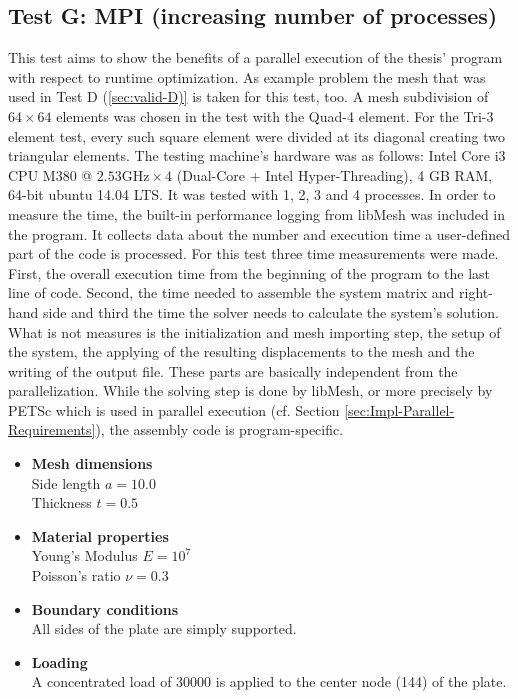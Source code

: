  \subsection{Test G: MPI (increasing number of processes)}\label{sec:valid-G}
  This test aims to show the benefits of a parallel execution of the thesis' program with respect to runtime optimization. As example problem the mesh that was used in Test D (\ref{sec:valid-D)} is taken for this test, too. A mesh subdivision of $64\!\times\!64$ elements was chosen in the test with the Quad-4 element. For the Tri-3 element test, every such square element were divided at its diagonal creating two triangular elements. The testing machine's hardware was as follows: Intel Core i3 CPU M380 @ $2.53\text{GHz} \times 4$ (Dual-Core + Intel Hyper-Threading), 4 GB RAM, 64-bit ubuntu 14.04 LTS. It was tested with 1, 2, 3 and 4 processes. In order to measure the time, the built-in performance logging from libMesh was included in the program. It collects data about the number and execution time a user-defined part of the code is processed. For this test three time measurements were made. First, the overall execution time from the beginning of the program to the last line of code. Second, the time needed to assemble the system matrix and right-hand side and third the time the solver needs to calculate the system's solution. What is not measures is the initialization and mesh importing step, the setup of the system, the applying of the resulting displacements to the mesh and the writing of the output file. These parts are basically independent from the parallelization. While the solving step is done by libMesh, or more precisely by PETSc which is used in parallel execution (cf. Section \ref{sec:Impl-Parallel-Requirements}), the assembly code is program-specific.
  
  \begin{itemize}
   \item \textbf{Mesh dimensions}\\
   Side length $a = 10.0$\\
   Thickness $t = 0.5$
         	
   \item \textbf{Material properties}\\
   Young's Modulus $E = 10^7$\\
   Poisson's ratio $\nu = 0.3$
         	
   \item \textbf{Boundary conditions}\\
   All sides of the plate are simply supported.
        	
   \item \textbf{Loading}\\
   A concentrated load of $30000$ is applied to the center node (144) of the plate.
  \end{itemize}
  
